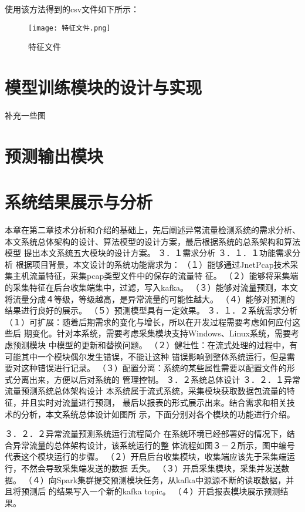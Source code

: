 使用该方法得到的csv文件如下所示：
\begin{figure}
    \centering
    \texttt{[image: 特征文件.png]}
    \caption{特征文件}
    \label{fig:特征文件}
  \end{figure}


\section{模型训练模块的设计与实现}
补充一些图
\section{预测输出模块}
\section{系统结果展示与分析}
本章在第二章技术分析和介绍的基础上，先后阐述异常流量检测系统的需求分析、
本文系统总体架构的设计、算法模型的设计方案，最后根据系统的总系架构和算法模型
提出本文系统五大模块的设计方案。
３．１需求分析
３．１．１功能需求分析
根据项目背景，本文设计的系统功能需求为：
（１）能够通过JnetPcap技术采集主机流量特征，采集pcap类型文件中的保存的流量特
征。
（２）能够将采集端的采集特征在后台收集端集中，过滤，写入kafka。
（３）能够对流量预测，本文将流量分成４等级，等级越高，是异常流量的可能性越大。
（４）能够对预测的结果进行良好的展示。
（５）预测模型具有一定效果。
３．１．２系统需求分析
（１）可扩展：随着后期需求的变化与增长，所以在开发过程需要考虑如何应付这些后
期变化。针对本系统，需要考虑采集模块支持Windows、Linux系统，需要考虑预测模块
中模型的更新和替换问题。
（２）健壮性：在流式处理的过程中，有可能其中一个模块偶尔发生错误，不能让这种
错误影响到整体系统运行，但是需要对这种错误进行记录。
（３）配置分离：系统的某些属性需要以配置文件的形式分离出来，方便以后对系统的
管理控制。
３．２系统总体设计
３．２．１异常流量预测系统总体架构设计
本系统属于流式系统，采集模块获取数据包流量的特征，并且实时对流量进行预测，
最后以报表的形式展示出来。结合需求和相关技术的分析，本文系统总体设计如图所
示，下面分别对各个模块的功能进行介绍。

３．２．２异常流量预测系统运行流程简介
在系统环境已经部署好的情况下，结合异常流量的总体架构设计，该系统运行的整
体流程如图３－２所示，图中编号代表这个模块运行的步骤。
（２）开启后台收集模块，收集端应该先于采集端运行，不然会导致采集端发送的数据
丢失。
（３）开启采集模块，采集并发送数据。
（４）向Spark集群提交预测模块任务，从kafka中源源不断的读取数据，并且将预测后
的结果写入一个新的kafka topic。
（４）开启报表模块展示预测结果。


